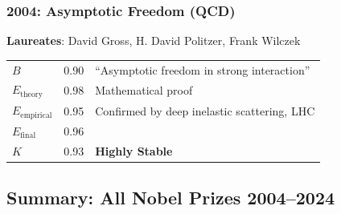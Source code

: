 \documentclass[11pt,a4paper]{article}
\begin{document}
\subsubsection{2004: Asymptotic Freedom (QCD)}
\textbf{Laureates}: David Gross, H. David Politzer, Frank Wilczek

\begin{center}
\begin{tabular}{lcl}
\toprule
$B$ & 0.90 & ``Asymptotic freedom in strong interaction'' \\
$E_{\text{theory}}$ & 0.98 & Mathematical proof \\
$E_{\text{empirical}}$ & 0.95 & Confirmed by deep inelastic scattering, LHC \\
\midrule
$E_{\text{final}}$ & 0.96 & \\
$K$ & 0.93 & \textbf{Highly Stable} \\
\bottomrule
\end{tabular}
\end{center}

\subsection{Summary: All Nobel Prizes 2004--2024}
\end{document}
